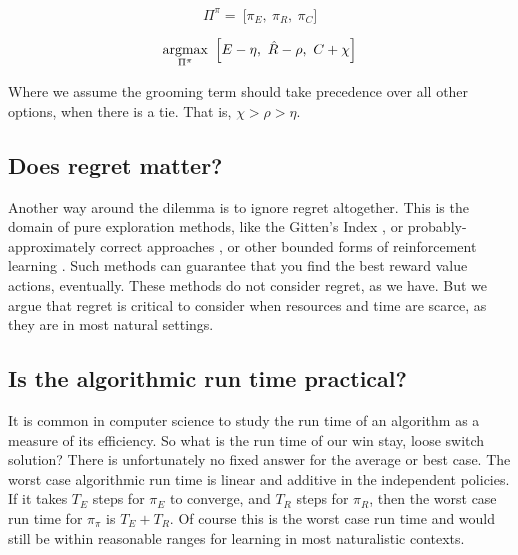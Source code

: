 \begin{equation}
\label{eq:pipi_c} 
\Pi^{\pi} = \ \Big [ \pi_E,\ \pi_R,\ \pi_C \Big ]
\end{equation}

\begin{equation}
\label{eq:meta_greedy_c} 
\operatorname*{argmax}_{\Pi^{\pi}} \ \Big [ E - \eta,\ \hat R - \rho,\ C + \chi \Big ]
\end{equation}

Where we assume the grooming term should take precedence over all other options, when there is a tie. That is, $\chi > \rho > \eta$.



\subsection*{Does regret matter?}
Another way around the dilemma is to ignore regret altogether. This is the domain of pure exploration methods, like the Gitten’s Index \cite{Gittins1979}, or probably-approximately correct approaches \cite{Valiant1984}, or other bounded forms of reinforcement learning \cite{Brafman2002}. Such methods can guarantee that you find the best reward value actions, eventually. These methods do not consider regret, as we have. But we argue that regret is critical to consider when resources and time are scarce, as they are in most natural settings. 



\subsection*{Is the algorithmic run time practical?}
It is common in computer science to study the run time of an algorithm as a measure of its efficiency. So what is the run time of our win stay, loose switch solution? There is unfortunately no fixed answer for the average or best case. The worst case algorithmic run time is linear and additive in the independent policies. If it takes $T_E$ steps for $\pi_E$ to converge, and $T_R$ steps for $\pi_R$, then the worst case run time for $\pi_{\pi}$ is $T_E + T_R$. Of course this is the worst case run time and would still be within reasonable ranges for learning in most naturalistic contexts.

